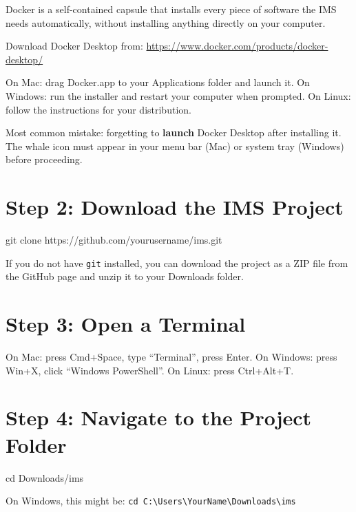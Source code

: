 \documentclass[12pt, a4paper]{report}
\begin{document}
Docker is a self-contained capsule that installs every piece of software the IMS needs automatically, without installing anything directly on your computer.

\begin{actionbox}
Download Docker Desktop from: \url{https://www.docker.com/products/docker-desktop/}

On Mac: drag Docker.app to your Applications folder and launch it. On Windows: run the installer and restart your computer when prompted. On Linux: follow the instructions for your distribution.
\end{actionbox}

\begin{warningbox}
Most common mistake: forgetting to \textbf{launch} Docker Desktop after installing it. The whale icon must appear in your menu bar (Mac) or system tray (Windows) before proceeding.
\end{warningbox}

\section{Step 2: Download the IMS Project}

\begin{termbox}
git clone https://github.com/yourusername/ims.git
\end{termbox}

If you do not have \texttt{git} installed, you can download the project as a ZIP file from the GitHub page and unzip it to your Downloads folder.

\section{Step 3: Open a Terminal}

On Mac: press Cmd+Space, type ``Terminal'', press Enter. On Windows: press Win+X, click ``Windows PowerShell''. On Linux: press Ctrl+Alt+T.

\section{Step 4: Navigate to the Project Folder}

\begin{termbox}
cd Downloads/ims
\end{termbox}

On Windows, this might be: \texttt{cd C:\textbackslash Users\textbackslash YourName\textbackslash Downloads\textbackslash ims}
\end{document}
